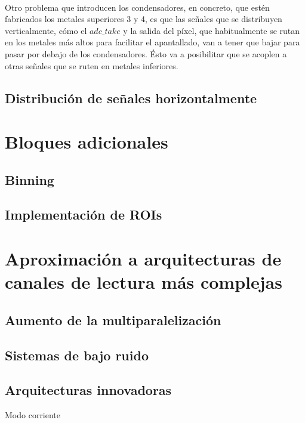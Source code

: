 \paragraph{}
Otro problema que introducen los condensadores, en concreto, que estén fabricados
los metales superiores 3 y 4, es que las señales que se distribuyen verticalmente,
cómo el $adc\_take$ y la salida del píxel, que habitualmente se rutan en los metales
más altos para facilitar el apantallado, van a tener que bajar para pasar por debajo
de los condensadores. Ésto va a posibilitar que se acoplen a otras señales que se ruten
en metales inferiores.

\subsection{Distribución de señales horizontalmente}



\section{Bloques adicionales}


\subsection{Binning}

\subsection{Implementación de ROIs}

\section{Aproximación a arquitecturas de canales de lectura más complejas}

\subsection{Aumento de la multiparalelización}

\subsection{Sistemas de bajo ruido}

\subsection{Arquitecturas innovadoras}
Modo corriente
